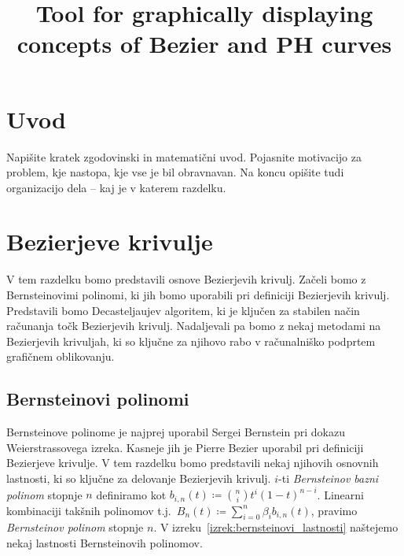 \documentclass[isrm2, tisk]{fmfdelo}
\title{Tool for graphically displaying concepts of Bezier and PH curves}
\newcommand{\bernstein}[2]{\binom{#1}{#2}t^{#2}(1-t)^{#1-#2}}
\newcommand{\lilb}[2]{b_{#1,#2}(t)}
\newcommand{\bigb}[1]{B_{#1}(t)}
\newcommand{\bernsteinsum}[2]{\sum_{#1=0}^{#2} \beta_{#1}\lilb{#1}{#2}}
\newcommand{\bsum}{\bernsteinsum{i}{n}}
\begin{document}
    \section{Uvod}
    Napišite kratek zgodovinski in matematični uvod. Pojasnite motivacijo za problem, kje
    nastopa, kje vse je bil obravnavan. Na koncu opišite tudi organizacijo dela -- kaj je v
    katerem razdelku.


    \section{Bezierjeve krivulje}\label{sec:bezierjeve-krivulje}
    V tem razdelku bomo predstavili osnove Bezierjevih krivulj.
    Začeli bomo z Bernsteinovimi polinomi, ki jih bomo uporabili pri definiciji Bezierjevih krivulj.
    Predstavili bomo Decasteljaujev algoritem, ki je ključen za stabilen način računanja točk Bezierjevih krivulj.
    Nadaljevali pa bomo z nekaj metodami na Bezierjevih krivuljah, ki so ključne za njihovo rabo v računalniško podprtem grafičnem oblikovanju.

    \subsection{Bernsteinovi polinomi}\label{subsec:bernsteinovi-polinomi}
    Bernsteinove polinome je najprej uporabil Sergei Bernstein pri dokazu Weierstrassovega izreka.
    Kasneje jih je Pierre Bezier uporabil pri definiciji Bezierjeve krivulje.
    V tem razdelku bomo predstavili nekaj njihovih osnovnih lastnosti, ki so ključne za delovanje Bezierjevih krivulj.
    $i$-ti \textit{Bernsteinov bazni polinom} stopnje $n$ definiramo kot $\lilb{i}{n} \coloneqq\bernstein{n}{i}$.
    Linearni kombinaciji takšnih polinomov t.j.\ $\bigb{n} \coloneqq \bsum$, pravimo \textit{Bernsteinov polinom} stopnje $n$.
    V izreku~\ref{izrek:bernsteinovi_lastnosti} naštejemo nekaj lastnosti Bernsteinovih polinomov.
\end{document}

